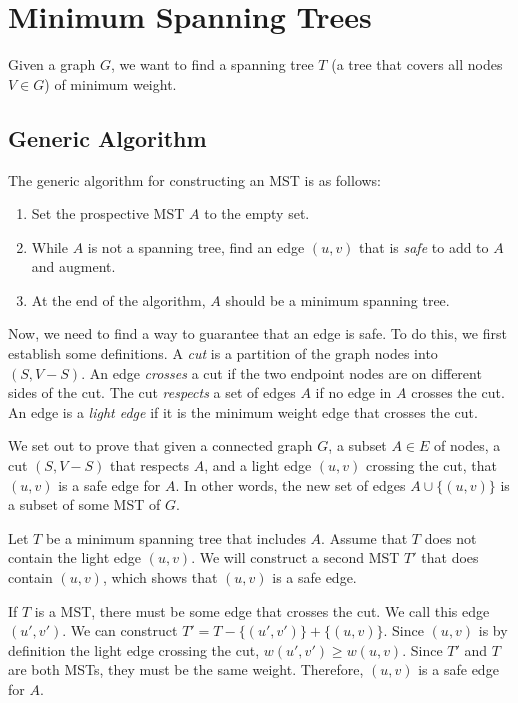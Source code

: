 \documentclass[10pt]{article}
\begin{document}
\section{Minimum Spanning Trees}
Given a graph $G$, we want to find a spanning tree $T$ (a tree that covers all nodes $V \in G$) of minimum weight.
\subsection*{Generic Algorithm}
The generic algorithm for constructing an MST is as follows:
\begin{enumerate}
    \item Set the prospective MST $A$ to the empty set.
    \item While $A$ is not a spanning tree, find an edge $(u, v)$ that is \textit{safe} to add to $A$ and augment.
    \item At the end of the algorithm, $A$ should be a minimum spanning tree.
\end{enumerate}
Now, we need to find a way to guarantee that an edge is safe. To do this, we first establish some definitions. A \textit{cut} is a partition of the graph nodes into $(S, V-S)$. An edge \textit{crosses} a cut if the two endpoint nodes are on different sides of the cut. The cut \textit{respects} a set of edges $A$ if no edge in $A$ crosses the cut. An edge is a \textit{light edge} if it is the minimum weight edge that crosses the cut.

We set out to prove that given a connected graph $G$, a subset $A \in E$ of nodes, a cut $(S, V-S)$ that respects $A$, and a light edge $(u, v)$ crossing the cut, that $(u, v)$ is a safe edge for $A$. In other words, the new set of edges $A \cup \{(u, v)\}$ is a subset of some MST of $G$.

Let $T$ be a minimum spanning tree that includes $A$. Assume that $T$ does not contain the light edge $(u, v)$. We will construct a second MST $T'$ that does contain $(u, v)$, which shows that $(u, v)$ is a safe edge.

If $T$ is a MST, there must be some edge that crosses the cut. We call this edge $(u', v')$. We can construct $T' = T - \{(u', v')\} + \{(u, v)\}$. Since $(u, v)$ is by definition the light edge crossing the cut, $w(u', v') \geq w(u, v)$. Since $T'$ and $T$ are both MSTs, they must be the same weight. Therefore, $(u, v)$ is a safe edge for $A$.
\end{document}
